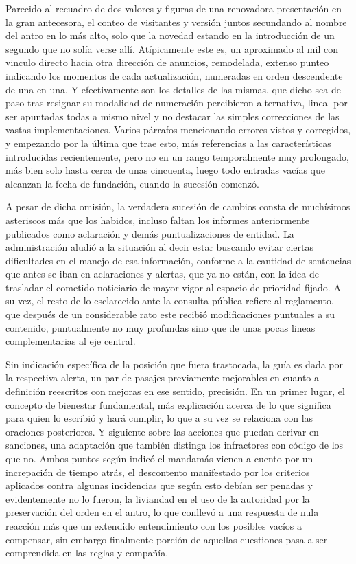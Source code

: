 \documentclass[
]{book}
\begin{document}
Parecido al recuadro de dos valores y figuras de una renovadora presentación en la gran antecesora, el conteo de visitantes y versión juntos secundando al nombre del antro en lo más alto, solo que la novedad estando en la introducción de un segundo que no solía verse allí. Atípicamente este es, un aproximado al mil con vinculo directo hacia otra dirección de anuncios, remodelada, extenso punteo indicando los momentos de cada actualización, numeradas en orden descendente de una en una. Y efectivamente son los detalles de las mismas, que dicho sea de paso tras resignar su modalidad de numeración percibieron alternativa, lineal por ser apuntadas todas a mismo nivel y no destacar las simples correcciones de las vastas implementaciones. Varios párrafos mencionando errores vistos y corregidos, y empezando por la última que trae esto, más referencias a las características introducidas recientemente, pero no en un rango temporalmente muy prolongado, más bien solo hasta cerca de unas cincuenta, luego todo entradas vacías que alcanzan la fecha de fundación, cuando la sucesión comenzó.

A pesar de dicha omisión, la verdadera sucesión de cambios consta de muchísimos asteriscos más que los habidos, incluso faltan los informes anteriormente publicados como aclaración y demás puntualizaciones de entidad. La administración aludió a la situación al decir estar buscando evitar ciertas dificultades en el manejo de esa información, conforme a la cantidad de sentencias que antes se iban en aclaraciones y alertas, que ya no están, con la idea de trasladar el cometido noticiario de mayor vigor al espacio de prioridad fijado. A su vez, el resto de lo esclarecido ante la consulta pública refiere al reglamento, que después de un considerable rato este recibió modificaciones puntuales a su contenido, puntualmente no muy profundas sino que de unas pocas lineas complementarias al eje central.

Sin indicación específica de la posición que fuera trastocada, la guía es dada por la respectiva alerta, un par de pasajes previamente mejorables en cuanto a definición reescritos con mejoras en ese sentido, precisión. En un primer lugar, el concepto de bienestar fundamental, más explicación acerca de lo que significa para quien lo escribió y hará cumplir, lo que a su vez se relaciona con las oraciones posteriores. Y siguiente sobre las acciones que puedan derivar en sanciones, una adaptación que también distinga los infractores con código de los que no. Ambos puntos según indicó el mandamás vienen a cuento por un increpación de tiempo atrás, el descontento manifestado por los criterios aplicados contra algunas incidencias que según esto debían ser penadas y evidentemente no lo fueron, la liviandad en el uso de la autoridad por la preservación del orden en el antro, lo que conllevó a una respuesta de nula reacción más que un extendido entendimiento con los posibles vacíos a compensar, sin embargo finalmente porción de aquellas cuestiones pasa a ser comprendida en las reglas y compañía.
\end{document}

